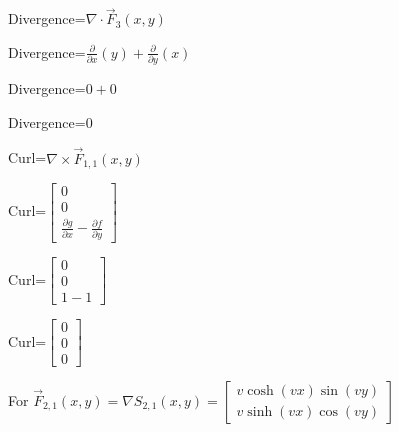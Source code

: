 \documentclass[12pt, executivepaper]{article}
\begin{document}
\begin{flushleft}
\vspace{3mm}

Divergence=$\nabla \cdot \vec F_{3}(x,y)$ \\

\vspace{3mm}

Divergence=$\frac{\partial}{\partial x}(y)+\frac{\partial}{\partial y}(x)$ \\

\vspace{3mm}

Divergence=$0+0$ \\

\vspace{3mm}

Divergence=$0$ \\

\vspace{3mm}

Curl=$\nabla \times \vec F_{1,1}(x,y)$ \\

\vspace{3mm}

Curl=$\begin{bmatrix}
0 \\
0 \\
\frac{\partial g}{\partial x}-\frac{\partial f}{\partial y}
\end{bmatrix}$ \\

\vspace{3mm}

Curl=$\begin{bmatrix}
0 \\
0 \\
1-1
\end{bmatrix}$ \\

\vspace{3mm}

Curl=$\begin{bmatrix}
0 \\
0 \\
0
\end{bmatrix}$ \\

\vspace{5mm}

For $\vec F_{2,1}(x,y)=\nabla S_{2,1}(x,y)=
\begin{bmatrix}
v\cosh(vx)\sin(vy) \\
v\sinh(vx)\cos(vy)
\end{bmatrix}$


\end{flushleft}
\end{document}
